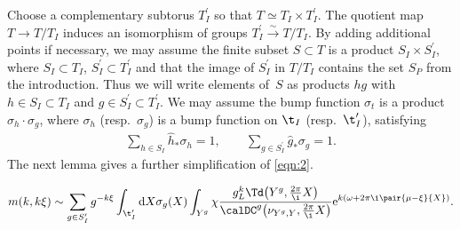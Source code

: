 Choose a complementary subtorus $T_I^\prime$ so that $T\simeq T_I \times T_I^\prime$. The quotient map $T \rightarrow T/T_I$ induces an isomorphism of groups $T_I^\prime \xrightarrow{\sim}T/T_I$.
By adding additional points if necessary, we may assume the finite subset $S\subset T$ is a product $S_I\times S_I^\prime$, where $S_I \subset T_I$, $S_I^\prime \subset T_I^\prime$ and that the image of $S_I^\prime$ in $T/T_I$ contains the set $S_P$ from the introduction. Thus we will write elements of~$S$ as products $hg$ with $h \in S_I \subset T_I$ and $g \in S_I^\prime \subset T_I^\prime$. We may assume the bump function $\sigma_t$ is a product $\sigma_h \cdot \sigma_g$, where $\sigma_h$ (resp.~$\sigma_g$) is a bump function on $\t_I$ (resp.~$\t_I^\prime$), satisfying
\begin{gather}\label{eqn:Sum1}
 \sum_{h \in S_I} \hat{h}_\ast\sigma_h=1, \qquad \sum_{g \in S_I^\prime} \hat{g}_\ast\sigma_g=1.
\end{gather}
The next lemma gives a further simplification of \eqref{eqn:2}.
\begin{Lemma}
\begin{gather}
\label{eqn:Asympt2}
m(k,k\xi)\sim \sum_{g \in S_I^\prime}g^{-k\xi} \int_{\t_I^\prime}{\rm d} X\sigma_g(X) \int_{Y^g} \chi \frac{g_L^k\Td\big(Y^g,\tfrac{2\pi}{\i}X\big)}{\calDC^g\big(\nu_{Y^g,Y},\tfrac{2\pi}{\i}X\big)}{\rm e}^{k(\omega+2\pi \i\pair{\mu-\xi}{X})}.
\end{gather}
\end{Lemma}
